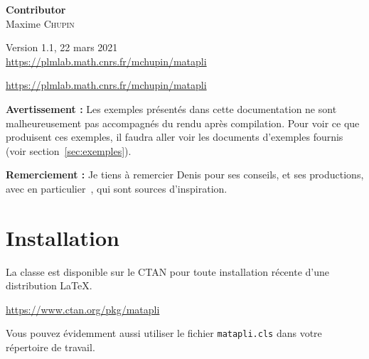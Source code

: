 \documentclass{mataplidoc}
\begin{document}
\hfill\parbox{0.3\textwidth}{\Large\raggedleft
  \textbf{Contributor}\\
  Maxime \textsc{Chupin}
}
\vfill
\begin{center}
  Version 1.1, 22 mars 2021 \\
  \url{https://plmlab.math.cnrs.fr/mchupin/matapli}
\end{center}
\newpage

\maketitle

\begin{abstract}
  La classe \LaTeX{} \Verb+matapli+ est destinée à la composition de la revue
  MATAPLI de la SMAI. Cette classe  contient à la fois les éléments
  permettant de rédiger un article pour cette revue et les éléments
  permettant de composer la revue dans sa globalité.
\end{abstract}

\begin{center}
  \url{https://plmlab.math.cnrs.fr/mchupin/matapli}
\end{center}


\tableofcontents
\bigskip

\noindent\textbf{Avertissement :} Les exemples présentés dans cette
documentation ne sont malheureusement pas accompagnés du rendu après
compilation. Pour voir ce que produisent ces exemples, il faudra aller
voir les documents d'exemples fournis (voir section~\ref{sec:exemples}).

\noindent\textbf{Remerciement :} Je tiens à remercier Denis  pour
ses conseils, et ses productions, avec en particulier~\cite{gazette,yathesis},
qui sont sources d'inspiration.

\section{Installation}

La classe \matapli{} est disponible sur le CTAN pour toute installation
récente d'une distribution \LaTeX.

\begin{center}
  \url{https://www.ctan.org/pkg/matapli}
\end{center}

Vous pouvez évidemment aussi utiliser le fichier \Verb+matapli.cls+
dans votre répertoire de travail.
\end{document}
